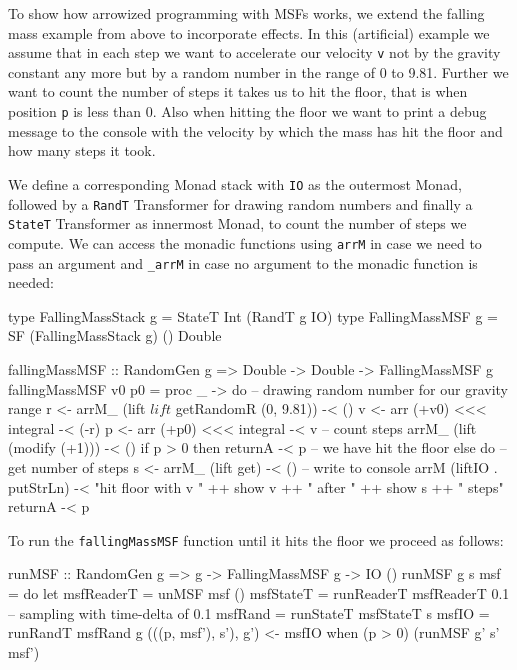To show how arrowized programming with MSFs works, we extend the falling mass example from above to incorporate effects. In this (artificial) example we assume that in each step we want to accelerate our velocity \texttt{v} not by the gravity constant any more but by a random number in the range of 0 to 9.81. Further we want to count the number of steps it takes us to hit the floor, that is when position \texttt{p} is less than 0. Also when hitting the floor we want to print a debug message to the console with the velocity by which the mass has hit the floor and how many steps it took.

We define a corresponding Monad stack with \texttt{IO} as the outermost Monad, followed by a \texttt{RandT} Transformer for drawing random numbers and finally a \texttt{StateT} Transformer as innermost Monad, to count the number of steps we compute. We can access the monadic functions using \texttt{arrM} in case we need to pass an argument and \texttt{\_arrM} in case no argument to the monadic function is needed:

\begin{HaskellCode}
type FallingMassStack g = StateT Int (RandT g IO)
type FallingMassMSF g   = SF (FallingMassStack g) () Double

fallingMassMSF :: RandomGen g => Double -> Double -> FallingMassMSF g
fallingMassMSF v0 p0 = proc _ -> do
  -- drawing random number for our gravity range
  r <- arrM_ (lift $ lift $ getRandomR (0, 9.81)) -< ()
  v <- arr (+v0) <<< integral -< (-r)
  p <- arr (+p0) <<< integral -< v
  -- count steps
  arrM_ (lift (modify (+1))) -< ()
  if p > 0
    then returnA -< p
    -- we have hit the floor
    else do
      -- get number of steps
      s <- arrM_ (lift get) -< ()
      -- write to console
      arrM (liftIO . putStrLn) -< "hit floor with v " ++ show v ++ 
                                  " after " ++ show s ++ " steps"
      returnA -< p
\end{HaskellCode}

To run the \texttt{fallingMassMSF} function until it hits the floor we proceed as follows:

\begin{HaskellCode}
runMSF :: RandomGen g => g -> FallingMassMSF g -> IO ()
runMSF g s msf = do
  let msfReaderT = unMSF msf ()
      msfStateT  = runReaderT msfReaderT 0.1 -- sampling with time-delta of 0.1
      msfRand    = runStateT msfStateT s
      msfIO      = runRandT msfRand g
  (((p, msf'), s'), g') <- msfIO
  when (p > 0) (runMSF g' s' msf')
\end{HaskellCode}

